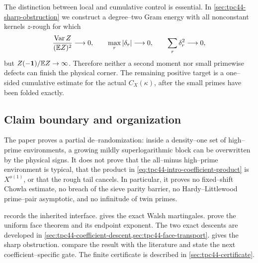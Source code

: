 The distinction between local and cumulative control is essential.  In
\cref{sec:tpc44-sharp-obstruction} we construct a degree--two Gram
energy with all nonconstant kernels \(z\)-rough for which
\begin{equation}
 \frac{\operatorname{Var}Z}{(\mathbb E Z)^2}\longrightarrow0,
 \qquad
 \max_r|\delta_r|\longrightarrow0,
 \qquad
 \sum_r\delta_r^2\longrightarrow0,
 \label{eq:tpc44-intro-small-local}
\end{equation}
but \(Z(-\mathbf 1)/\mathbb E Z\to\infty\).  Therefore neither a second moment nor
small primewise defects can finish the physical corner.  The remaining
positive target is a one--sided cumulative estimate for the actual
\(C_X(\kappa)\), after the small primes have been folded exactly.

\subsection{Claim boundary and organization}

The paper proves a partial de--randomization: inside a density--one set
of high--prime environments, a growing mildly superlogarithmic block can
be overwritten by the physical signs.  It does not prove that the
all--minus high--prime environment is typical, that the product in
\eqref{eq:tpc44-intro-coefficient-product} is \(X^{o(1)}\), or that the
rough tail cancels.  In particular, it proves no fixed--shift Chowla
estimate, no breach of the sieve parity barrier, no Hardy--Littlewood
prime--pair asymptotic, and no infinitude of twin primes.

 records the inherited interface.
 gives the exact Walsh martingales.
 prove the
uniform face theorem and its endpoint exponent.  The two exact descents
are developed in
\cref{sec:tpc44-coefficient-descent,sec:tpc44-face-transport}.
 gives the sharp obstruction.
 compare the result with
the literature and state the next coefficient--specific gate.  The
finite certificate is described in \cref{sec:tpc44-certificate}.
